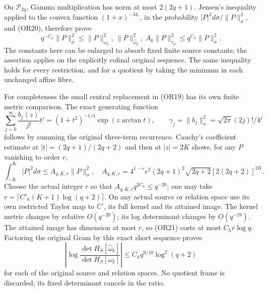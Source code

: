 \documentclass[11pt]{article}
\newcommand{\PP}{\mathcal P}
\begin{document}
On \(\PP_{2q}\), Gamma multiplication has norm at most \(2(2q+1)\).
Jensen's inequality applied to the convex function
\((1+x)^{-M_*}\), in the probability
\(|P|^2d\sigma/\|P\|_\sigma^2\), and (OR20), therefore prove
\[
 q^{-C_h}\|P\|_\sigma^2\leq
 \|P\|_{\omega_k}^2,\ \|P\|_{\widehat\omega_k}^2,\
 A_k\|P\|_{\tau_d}^2
 \leq q^{C_h}\|P\|_\sigma^2 .                        \tag{OR21}
\]
The constants here can be enlarged to absorb fixed finite source
constants; the assertion applies on the explicitly cofinal original
sequence.  The same inequality holds for every restriction, and
for a quotient by taking the minimum in each unchanged affine
fibre.

For completeness the small central replacement in (OR19) has its
own finite metric comparison.  The exact generating function
\[
 \sum_{j=0}^\infty\frac{b_j(z)}{j!}t^j
 =(1+t^2)^{-1/4}\exp(z\arctan t),\qquad
 \gamma_j=\|b_j\|_\sigma^2=\sqrt{2\pi}(2j)!/4^j
\]
follows by summing the original three-term recurrence.
Cauchy's coefficient estimate at \(|t|=(2q+1)/(2q+2)\)
and then at \(|z|=2K\) shows, for any \(P\) vanishing to order \(r\),
\[
 \int_{-K}^K|P|^2d\sigma
 \leq A_{q,K,r}\|P\|_\sigma^2,\quad
 A_{q,K,r}=4^{1-r}e^2(2q+1)^2\sqrt{2q+2}
                    [2(2q+2)]^{2K}.                \tag{OR22}
\]
Choose the actual integer \(r\) so that
\(A_{q,K,r}q^{2C_h}\leq q^{-20}\); one may take
\(r=\lceil C'_h(K+1)\log(q+2)\rceil\).
On any actual source or relation space use its own restricted
Taylor map to \(\mathbb C^r\), its full kernel and its attained
image.  The kernel metric changes by relative \(O(q^{-20})\);
its log determinant changes by \(O(q^{-19})\).
The attained image has dimension at most \(r\), so (OR21) costs
at most \(C_h r\log q\).  Factoring the original Gram by this
exact short sequence proves
\[
 \left|\log\frac{\det H_S[\widehat\omega_k]}
                        {\det H_S[\omega_k]}\right|
 \leq C_h q^{9/10}\log^2(q+2)                       \tag{OR23}
\]
for each of the original source and relation spaces.
No quotient frame is discarded; its fixed determinant cancels in
the ratio.
\end{document}
